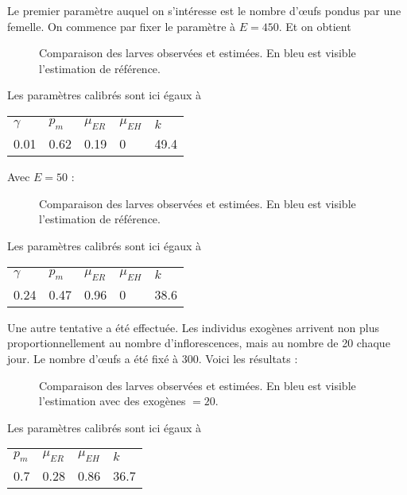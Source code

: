 \documentclass[a4paper, 11pt]{article}
\begin{document}
Le premier paramètre auquel on s'intéresse est le nombre d'œufs pondus par une femelle.
On commence par fixer le paramètre à $E = 450$. Et on obtient

\begin{figure}[h]
 \centering
 \caption{Comparaison des larves observées et estimées. En bleu est visible l'estimation de référence.}
\end{figure}

Les paramètres calibrés sont ici égaux à 

\begin{center}
\begin{tabular}{lllll}
$\gamma$ & $p_m$ & $\mu_{ER}$ & $\mu_{EH}$ & $k$\\
0.01 & 0.62 & 0.19 & 0 & 49.4
\end{tabular}
\end{center}

Avec $E = 50$ : 

\begin{figure}[h]
 \centering
 \caption{Comparaison des larves observées et estimées. En bleu est visible l'estimation de référence.}
\end{figure}

Les paramètres calibrés sont ici égaux à 

\begin{center}
\begin{tabular}{lllll}
$\gamma$ & $p_m$ & $\mu_{ER}$ & $\mu_{EH}$ & $k$\\
0.24 & 0.47 & 0.96 & 0 & 38.6
\end{tabular}
\end{center}


Une autre tentative a été effectuée. Les individus exogènes arrivent non plus proportionnellement au nombre d'inflorescences, mais au nombre de 20 chaque jour. Le nombre d'œufs a été fixé à 300. Voici les résultats :

\begin{figure}[h]
 \centering
 \caption{Comparaison des larves observées et estimées. En bleu est visible l'estimation avec des exogènes $=20$.}
\end{figure}

Les paramètres calibrés sont ici égaux à 

\begin{center}
\begin{tabular}{llll}
 $p_m$ & $\mu_{ER}$ & $\mu_{EH}$ & $k$\\
0.7 & 0.28 & 0.86 & 36.7
\end{tabular}
\end{center}
\end{document}
